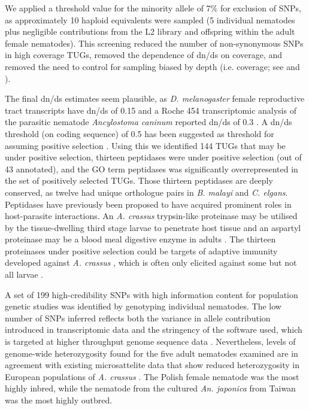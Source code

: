 \documentclass[10pt]{bmc_article}
\newenvironment{bmcformat}{\begin{raggedright}\baselineskip20pt\sloppy\setboolean{publ}{false}}{\end{raggedright}\baselineskip20pt\sloppy}
\begin{document}
\begin{bmcformat}
We applied a threshold value for the minority allele of 7\% for
exclusion of SNPs, as approximately 10 haploid equivalents were
sampled (5 individual nematodes plus negligible contributions from the
L2 library and offspring within the adult female nematodes). This
screening reduced the number of non-synonymous SNPs in high coverage
TUGs, removed the dependence of dn/ds on coverage, and removed the
need to control for sampling biased by depth (i.e. coverage; see
\cite{pmid18590545} and \cite{pmid20478048}).

The final dn/ds estimates seem plausible, as \textit{D. melanogaster}
female reproductive tract transcripts have dn/ds of 0.15
\cite{pmid15579698} and a Roche 454 transcriptomic analysis of the
parasitic nematode \textit{Ancylostoma caninum} reported dn/ds of 0.3
\cite{pmid20470405}. A dn/ds threshold (on coding sequence) of 0.5 has
been suggested as threshold for assuming positive selection
\cite{pmid15579698}. Using this we identified 144 TUGs that may be
under positive selection, thirteen peptidases were under positive
selection (out of 43 annotated), and the GO term peptidases was
significantly overrepresented in the set of positively selected
TUGs. Those thirteen peptidases are deeply conserved, as twelve had
unique orthologue pairs in \textit{B. malayi} and
\textit{C. elgans}. Peptidases have previously been proposed to have
acquired prominent roles in host-parasite interactions. An
\textit{A. crassus} trypsin-like proteinase may be utilised by the
tissue-dwelling third stage larvae to penetrate host tissue and an
aspartyl proteinase may be a blood meal digestive enzyme in adults
\cite{polzer_identification_1993}. The thirteen proteinases under
positive selection could be targets of adaptive immunity developed
against \textit{A. crassus} \cite{knopf_migratory_2008,
  knopf_vaccination_2008}, which is often only elicited against some
but not all larvae \cite{molnar_caps}.

A set of 199 high-credibility SNPs with high information content for
population genetic studies was identified by genotyping individual
nematodes. The low number of SNPs inferred reflects both the variance
in allele contribution introduced in transcriptomic data and the
stringency of the software used, which is targeted at higher
throughput genome sequence data \cite{pmid21653522x}. Nevertheless,
levels of genome-wide heterozygosity found for the five adult
nematodes examined are in agreement with existing microsattelite data
that show reduced heterozygosity in European populations of
\textit{A. crassus} \cite{wielgoss_population_2008}. The Polish female
nematode was the most highly inbred, while the nematode from the
cultured
\textit{An. japonica} from Taiwan was the most highly outbred.\\


\end{bmcformat}
\end{document}

